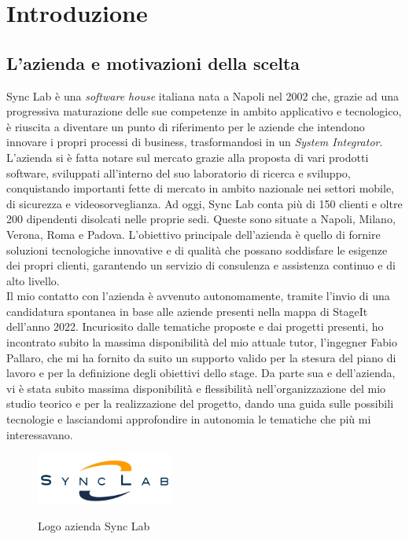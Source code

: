 \chapter{Introduzione}\label{cap:introduzione}

\section{L'azienda e motivazioni della scelta}

Sync Lab è una \textit{software house} italiana nata a Napoli nel 2002 che, grazie ad una progressiva
maturazione delle sue competenze in ambito applicativo e tecnologico, è riuscita a diventare un
punto di riferimento per le aziende che intendono innovare i propri processi di business,
trasformandosi in un \textit{System Integrator}. L'azienda si è fatta notare sul mercato grazie alla proposta
di vari prodotti software, sviluppati all'interno del suo laboratorio di ricerca e sviluppo, 
conquistando importanti fette di mercato in ambito nazionale nei settori mobile, di sicurezza e videosorveglianza.
Ad oggi, Sync Lab conta più di 150 clienti e oltre 200 dipendenti disolcati nelle proprie sedi.
Queste sono situate a Napoli, Milano, Verona, Roma e Padova.
L'obiettivo principale dell'azienda è quello di fornire soluzioni tecnologiche innovative e di qualità
che possano soddisfare le esigenze dei propri clienti, garantendo un servizio di consulenza
e assistenza continuo e di alto livello.\\

Il mio contatto con l'azienda è avvenuto autonomamente, tramite l'invio di una candidatura spontanea
in base alle aziende presenti nella mappa di StageIt dell'anno 2022. Incuriosito dalle tematiche proposte e dai progetti presenti,
ho incontrato subito la massima disponibilità del mio attuale tutor, l'ingegner Fabio Pallaro, che mi ha fornito da suito un supporto valido
per la stesura del piano di lavoro e per la definizione degli obiettivi dello stage. Da parte sua e dell'azienda, vi è stata subito 
massima disponibilità e flessibilità nell'organizzazione del mio studio teorico e per la realizzazione del progetto,
dando una guida sulle possibili tecnologie e lasciandomi approfondire in autonomia le tematiche che più mi interessavano.

\begin{figure}[h]
    \centering
    \includegraphics[width=0.4\textwidth, alt={Logo dell'azienda Sync Lab}]{immagini/synclab.png}
    \caption{Logo azienda Sync Lab}\label{fig:logo-synclab}
\end{figure}

